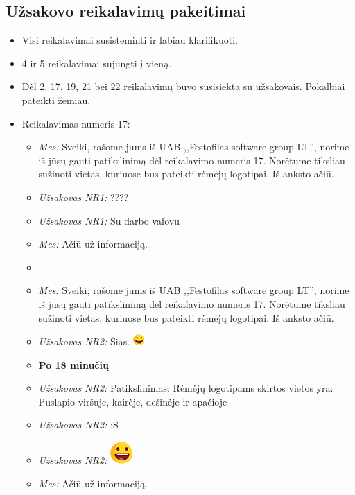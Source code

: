 \documentclass{VUMIFPSkursinis}
\begin{document}
	\subsection{Užsakovo reikalavimų pakeitimai} \label{priedai_uzsakovoReikalavimaiPakeitimai}
		\begin{itemize}
			\item Visi reikalavimai susisteminti ir labiau klarifikuoti.
			\item 4 ir 5 reikalavimai sujungti į vieną.
			\item Dėl 2, 17, 19, 21 bei 22 reikalavimų buvo susisiekta su užsakovais. Pokalbiai pateikti žemiau.
			\item Reikalavimas numeris 17:
				\begin{itemize}
					\item \textit{Mes:} Sveiki, rašome jums iš UAB ,,Festofilas software group LT'', norime iš jūsų gauti patikslinimą dėl reikalavimo numeris 17. Norėtume tiksliau sužinoti vietas, kuriuose bus pateikti rėmėjų logotipai. Iš anksto ačiū.
					\item \textit{Užsakovas NR1:} ????
					\item \textit{Užsakovas NR1:} Su darbo vafovu
					\item \textit{Mes:} Ačiū už informaciją.
					\item[ ]
					\item \textit{Mes:} Sveiki, rašome jums iš UAB ,,Festofilas software group LT'', norime iš jūsų gauti patikslinimą dėl reikalavimo numeris 17. Norėtume tiksliau sužinoti vietas, kuriuose bus pateikti rėmėjų logotipai. Iš anksto ačiū.
					\item \textit{Užsakovas NR2:} Šias. \includegraphics{img/smalllaugh.png}
					\item[ ]\textbf{Po 18 minučių}
					\item \textit{Užsakovas NR2:} Patikslinimas: Rėmėjų logotipams skirtos vietos yra: Puslapio viršuje, kairėje, dešinėje ir apačioje
					\item \textit{Užsakovas NR2:} :S
					\item \textit{Užsakovas NR2:} \includegraphics{img/biglaugh.png}
					\item \textit{Mes:} Ačiū už informaciją.
				\end{itemize}

\end{itemize}
\end{document}
